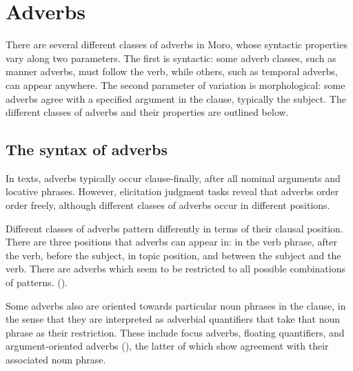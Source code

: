 
\section{Adverbs} \label{sec:ch13:adverbs}

There are several different classes of adverbs in Moro, whose syntactic properties vary along two parameters. The first is syntactic: some adverb classes, such as manner adverbs, must follow the verb, while others, such as temporal adverbs, can appear anywhere. The second parameter of variation is morphological: some adverbs agree with a specified argument in the clause, typically the subject. The different classes of adverbs and their properties are outlined below. %

\subsection{The syntax of adverbs}\label{sec:ch13:adverbsyntax}

In texts, adverbs typically occur clause-finally, after all nominal arguments and locative phrases. However, elicitation judgment tasks reveal that adverbs order order freely, although different classes of adverbs occur in different positions.

Different classes of adverbs pattern differently in terms of their clausal position. There are three positions that adverbs can appear in: in the verb phrase, after the verb, before the subject, in topic position, and between the subject and the verb. There are adverbs which seem to be restricted to all possible combinations of patterns. ().

Some adverbs also are oriented towards particular noun phrases in the clause, in the sense that they are interpreted as adverbial quantifiers that take that noun phrase as their restriction. These include focus adverbs, floating quantifiers, and argument-oriented adverbs (), the latter of which show agreement with their associated noun phrase. 

